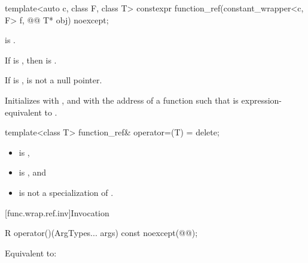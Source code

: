%
\begin{itemdecl}
template<auto c, class F, class T>
  constexpr function_ref(constant_wrapper<c, F> f, @\cv{}@ T* obj) noexcept;
\end{itemdecl}

\begin{itemdescr}
\pnum
\constraints
{} is .

\pnum
\mandates
If  is ,
then  is .

\pnum
\expects
If  is ,
 is not a null pointer.

\pnum
\effects
Initializes
 with , and
 with the address of a function 
such that
is expression-equivalent to
.
\end{itemdescr}

%
\begin{itemdecl}
template<class T> function_ref& operator=(T) = delete;
\end{itemdecl}

\begin{itemdescr}
\pnum
\constraints
\begin{itemize}
\item {} is ,
\item {} is , and
\item {} is not a specialization of .
\end{itemize}
\end{itemdescr}

[func.wrap.ref.inv]{Invocation}

%
\begin{itemdecl}
R operator()(ArgTypes... args) const noexcept(@@);
\end{itemdecl}

\begin{itemdescr}
\pnum
\effects
Equivalent to:
\end{itemdescr}

